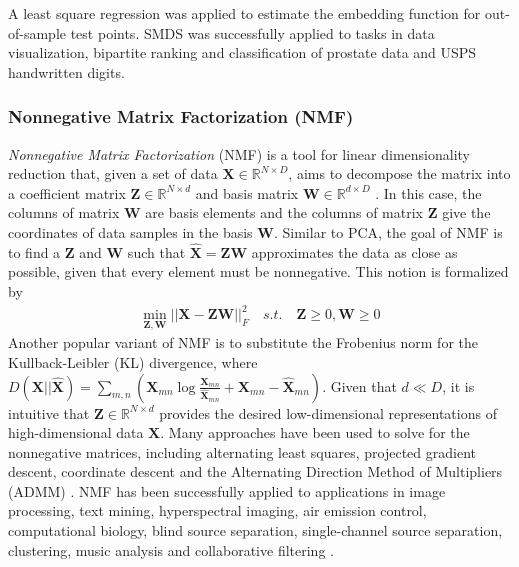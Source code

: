 A least square regression was applied to estimate the embedding function for out-of-sample  test points.  SMDS was successfully applied to tasks in data visualization, bipartite ranking and classification of prostate data and USPS handwritten digits.

\subsubsection{Nonnegative Matrix Factorization (NMF)} \label{sec:NMF}
\textit{Nonnegative Matrix Factorization} (NMF) is a tool for linear dimensionality reduction that, given a set of data $\bm{X} \in \mathbb{R}^{N \times D}$, aims to decompose the matrix into a coefficient matrix $\bm{Z} \in \mathbb{R}^{N \times d}$ and basis matrix $\bm{W} \in \mathbb{R}^{d \times D}$ \citep{Gillis2014NMF}.  In this case, the columns of matrix $\bm{W}$ are basis elements and  the columns of matrix $\bm{Z}$  give the coordinates of data samples in the basis $\bm{W}$. Similar to PCA, the goal of NMF is to find a $\bm{Z}$ and $\bm{W}$ such that $\hat{\bm{X}} = \bm{Z}\bm{W}$ approximates the data as close as possible, given that every element must be nonnegative.  This notion is formalized by
\begin{align}
	\min_{\bm{Z},\bm{W}} || \bm{X} - \bm{Z}\bm{W} ||^{2}_{F} \quad s.t. \quad \bm{Z} \geq 0, \bm{W} \geq 0
\end{align}
\noindent
Another popular variant of NMF is to substitute the Frobenius norm for the Kullback-Leibler (KL) divergence, where $D(\bm{X}||\hat{\bm{X}}) = \sum_{m,n}(\bm{X}_{mn} \log \frac{\bm{X}_{mn}}{\hat{\bm{X}}_{mn}} + \bm{X}_{mn} - \hat{\bm{X}}_{mn})$.  Given that $d \ll D$, it is intuitive that $\bm{Z} \in \mathbb{R}^{N \times d}$ provides the desired low-dimensional representations of high-dimensional data $\bm{X}.$  Many approaches have been used to solve for the nonnegative matrices, including alternating least squares, projected gradient descent, coordinate descent and the Alternating Direction Method of Multipliers (ADMM) \citep{Chao2019RecentAdvancesSupervisedDimRed}.  NMF has been successfully applied to applications in image processing, text mining, hyperspectral imaging, air emission control, computational biology, blind source separation, single-channel source separation, clustering, music analysis and collaborative filtering \citep{Gillis2014NMF}.  

